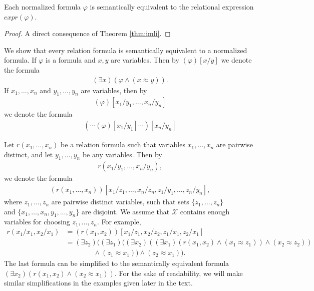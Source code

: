 \documentclass{lmcs}
\def\X{\mathcal X}
\def\expr{expr}
\begin{document}
\begin{lem}\label{lem:norm_form}
Each normalized formula $\varphi$ is semantically equivalent to the relational expression $\expr(\varphi)$. 
\end{lem}
\begin{proof}
A direct consequence of Theorem \ref{thm:imli}. 
\end{proof}

We show that every relation formula is semantically equivalent to a normalized formula. 
If $\varphi$ is a formula and $x,y$ are variables. Then by $(\varphi)[x/y]$ we denote the formula
\begin{align}
(\exists x)(\varphi\wedge(x\approx y)).
\end{align}
If $x_1,\ldots,x_n$ and $y_1,\ldots,y_n$ are variables, then by
\begin{align}
(\varphi)[x_1/y_1,\ldots,x_n/y_n] 
\end{align}
we denote the formula
\begin{align}
(\cdots(\varphi)[x_1/y_1]\cdots)[x_n/y_n] 
\end{align}

Let $r(x_1,\ldots,x_n)$ be a relation formula such that variables $x_1,\ldots,x_n$ are pairwise distinct, and let $y_1,\ldots,y_n$ be any variables. Then by
\begin{align}
r(x_1/y_1,\ldots,x_n/y_n), 
\end{align}
we denote the formula
\begin{align}
(r(x_1,\ldots,x_n))[x_1/z_1,\ldots,x_n/z_n,z_1/y_1,\ldots,z_n/y_n],
\end{align}
where $z_1,\ldots,z_n$ are pairwise distinct variables, such that sets $\{z_1,\ldots,z_n\}$ \\and $\{x_1,\ldots,x_n,y_1,\ldots,y_n\}$ are disjoint. We assume that $\X$ contains enough variables for choosing $z_1,\ldots,z_n$. For example, 
\begin{align*}
r(x_1/x_1,x_2/x_1)&=(r(x_1,x_2))[x_1/z_1,x_2/z_2,z_1/x_1,z_2/x_1]\\
&=(\exists z_2)((\exists z_1)((\exists x_2)((\exists x_1)(r(x_1,x_2)\wedge(x_1\approx z_1))\wedge(x_2\approx z_2))\\
&\phantom{===}\wedge(z_1\approx x_1))\wedge(z_2\approx x_1)). 
\end{align*}
The last formula can be simplified to the semantically equivalent formula $(\exists x_2)(r(x_1,x_2)\wedge(x_2\approx x_1))$. For the sake of readability, we will make similar simplifications in the examples given later in the text.
\end{document}
